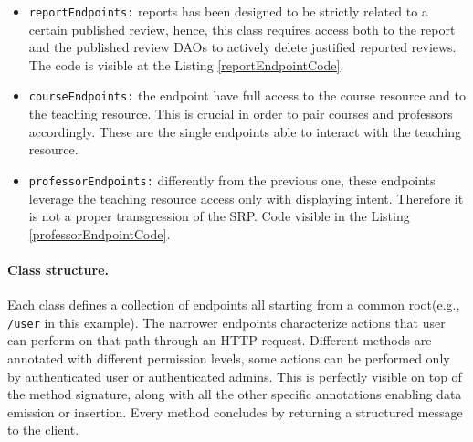 \begin{itemize}
	\item \texttt{reportEndpoints:} reports has been designed to be strictly related to a certain published review, hence, this class requires access both to the report and the published review DAOs to actively delete justified reported reviews. The code is visible at the Listing \ref{reportEndpointCode}. 
	\item \texttt{courseEndpoints:} the endpoint have full access to the course resource and to the teaching resource. This is crucial in order to pair courses and professors accordingly. These are the single endpoints able to interact with the teaching resource. 
	\item \texttt{professorEndpoints:} differently from the previous one, these endpoints leverage the teaching resource access only with displaying intent. Therefore it is not a proper transgression of the SRP. Code visible in the Listing \ref{professorEndpointCode}. 
\end{itemize}

\paragraph{\textbf{Class structure.}} Each class defines a collection of endpoints all starting from a common root(e.g., \texttt{/user} in this example). The narrower endpoints characterize actions that user can perform on that path through an HTTP request. Different methods are annotated with different permission levels, some actions can be performed only by authenticated user or authenticated admins. This is perfectly visible on top of the method signature, along with all the other specific annotations enabling data emission or insertion. Every method concludes by returning a structured message to the client.

